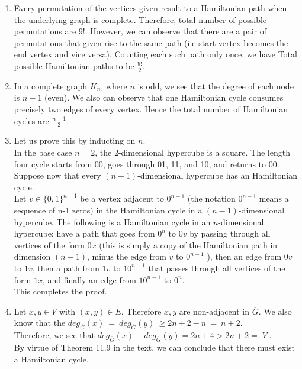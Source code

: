 \documentclass{article}
\begin{document}
\begin{enumerate}
\item Every permutation of the vertices given result to a Hamiltonian path when the underlying graph is complete. Therefore, total number of possible permutations are 9!. However, we can observe that there are a pair of permutations that given rise to the same path (i.e start vertex becomes the end vertex and vice versa). Counting each such path only once, we have Total possible Hamiltonian paths to be $\frac{9!}{2}$. 


\item In a complete graph $K_n$, where $n$ is odd, we see that the degree of each node is $n-1$ (even). We also can observe that one Hamiltonian cycle consumes precisely two edges of every vertex. Hence the total number of Hamiltonian cycles are $\frac{n-1}{2}$.




\item Let us prove this by inducting on $n$.\\ 
In the base case $n = 2$, the 2-dimensional hypercube is a square. The length four cycle starts from 00, goes through 01, 11, and 10, and returns to 00.\\
Suppose now that every $(n-1)$-dimensional hypercube has an Hamiltonian cycle. \\ 
Let $v \in \{0,1\}^{n-1}$ be a vertex adjacent to $0^{n-1}$ (the notation $0^{n-1}$ means a sequence of n-1 zeros) in the Hamiltonian cycle in a $(n-1)$-dimensional hypercube. The following is a Hamiltonian cycle in an $n$-dimensional hypercube: have a path that goes from $0^n$
to $0v$ by passing through all vertices of the form $0x$ (this is simply a copy of the
Hamiltonian path in dimension $(n-1)$, minus the edge from $v$ to $0^{n-1}$
), then an edge from $0v$ to $1v$, then a path from $1v$ to $10^{n-1}$ that passes through all vertices of the form $1x$, and finally an edge from $10^{n-1}$ to $0^n$.\\
This completes the proof.

\item Let $x,y \in V$ with $(x,y) \in E$. Therefore $x,y$ are non-adjacent in $\overline{G}$. We also know that the $deg_{\overline{G}}(x)\ =\ deg_{\overline{G}}(y)\ \geq 2n+2-n\ =\ n+2$. \\
Therefore, we see that $deg_{\overline{G}}(x) +  deg_{\overline{G}}(y) = 2n + 4 > 2n + 2 = |V|$.\\ 
By virtue of Theorem 11.9 in the text, we can conclude that there must exist a Hamiltonian cycle.

\end{enumerate}
\end{document}
